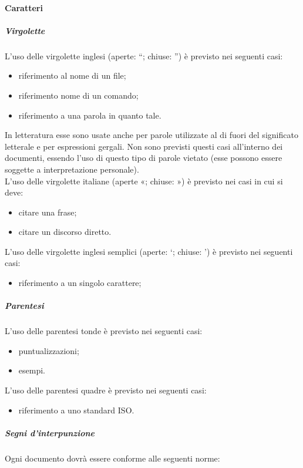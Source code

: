 			\paragraph{Caratteri}
				\subparagraph{Virgolette}
					L’uso delle virgolette inglesi (aperte: “; chiuse: ”) è previsto nei seguenti casi:
					\begin{itemize}
						\item riferimento al nome di un file;
						\item riferimento nome di un comando;
						\item riferimento a una parola in quanto tale.
					\end{itemize}
					In letteratura esse sono usate anche per parole utilizzate al di fuori del significato letterale e per espressioni gergali. Non sono previsti questi casi all’interno dei documenti, essendo l’uso di questo tipo di parole vietato (esse possono essere soggette a interpretazione personale).\\
					L’uso delle virgolette italiane (aperte «; chiuse: ») è previsto nei casi in cui si deve:
					\begin{itemize}
						\item citare una frase;
						\item citare un discorso diretto.
					\end{itemize}
					L’uso delle virgolette inglesi semplici (aperte: ‘; chiuse: ’) è previsto nei seguenti casi:
					\begin{itemize}
						\item riferimento a un singolo carattere;
					\end{itemize}
				\subparagraph{Parentesi}
					L’uso delle parentesi tonde è previsto nei seguenti casi:
					\begin{itemize}
						\item puntualizzazioni;
						\item esempi.
					\end{itemize}
					L’uso delle parentesi quadre è previsto nei seguenti casi:
					\begin{itemize}
						\item riferimento a uno standard ISO.
					\end{itemize}
				\subparagraph{Segni d'interpunzione}
					Ogni documento dovrà essere conforme alle seguenti norme:
